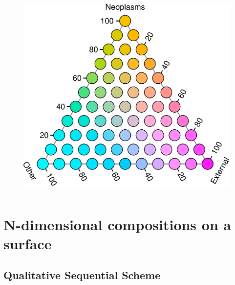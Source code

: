 \documentclass{beamer}
\begin{document}
\begin{frame}
\begin{columns}[c]
\begin{figure}[htb!]
\includegraphics[width = \textwidth]{../fig/talk/tern_balance_lgnd.pdf}
\end{figure}

\end{columns}

\end{frame}

\section{N-dimensional compositions on a surface} %

\subsection{Qualitative Sequential Scheme}
\end{document}

